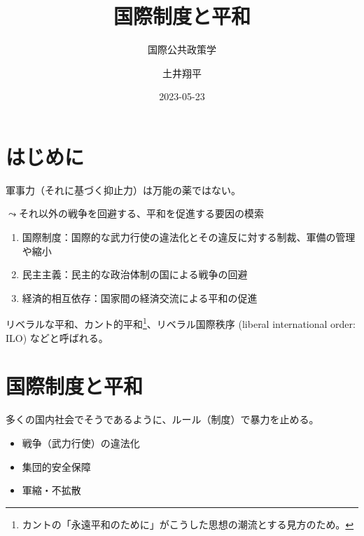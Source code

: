 \documentclass[
  xelatex,
  ja=standard]{bxjsarticle}
\title{国際制度と平和}
\subtitle{国際公共政策学}
\author{土井翔平}
\date{2023-05-23}
\providecommand{\tightlist}{%
  \setlength{\itemsep}{0pt}\setlength{\parskip}{0pt}}\usepackage{longtable,booktabs,array}
\begin{document}
\maketitle
\ifdefined\Shaded\renewenvironment{Shaded}{\begin{tcolorbox}[enhanced, boxrule=0pt, frame hidden, interior hidden, borderline west={3pt}{0pt}{shadecolor}, breakable, sharp corners]}{\end{tcolorbox}}\fi

\hypertarget{ux306fux3058ux3081ux306b}{%
\section*{はじめに}\label{ux306fux3058ux3081ux306b}}

軍事力（それに基づく抑止力）は万能の薬ではない。

\(\leadsto\)それ以外の戦争を回避する、平和を促進する要因の模索

\begin{enumerate}
\def\labelenumi{\arabic{enumi}.}
\tightlist
\item
  国際制度：国際的な武力行使の違法化とその違反に対する制裁、軍備の管理や縮小
\item
  民主主義：民主的な政治体制の国による戦争の回避
\item
  経済的相互依存：国家間の経済交流による平和の促進
\end{enumerate}

リベラルな平和、カント的平和\citep{oneal1997, oneal1999}\footnote{カントの「永遠平和のために」がこうした思想の潮流とする見方のため。}、リベラル国際秩序
(liberal international order: ILO)
\citep{ikenberry2009, ikenberry2018}などと呼ばれる。

\hypertarget{ux56fdux969bux5236ux5ea6ux3068ux5e73ux548c}{%
\section{国際制度と平和}\label{ux56fdux969bux5236ux5ea6ux3068ux5e73ux548c}}

多くの国内社会でそうであるように、ルール（制度）で暴力を止める。

\begin{itemize}
\tightlist
\item
  戦争（武力行使）の違法化
\item
  集団的安全保障
\item
  軍縮・不拡散
\end{itemize}
\end{document}
